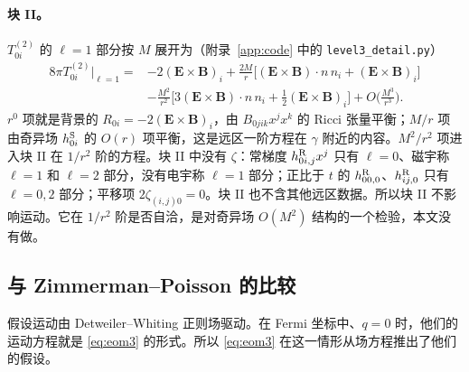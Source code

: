 \documentclass[11pt,a4paper]{ctexart}
\numberwithin{equation}{section}
\begin{document}
\paragraph{块 II。}$T^{(2)}_{0i}$ 的 $\ell=1$ 部分按 $M$ 展开为（附录~\ref{app:code} 中的 \texttt{level3\_detail.py}）
\begin{equation}
\begin{split}
8\pi T^{(2)}_{0i}\Big|_{\ell=1}={}&-2(\boldsymbol E\times\boldsymbol B)_i
+\frac{2M}{r}\Big[(\boldsymbol E\times\boldsymbol B)\!\cdot\!n\,n_i+(\boldsymbol E\times\boldsymbol B)_i\Big]\\
&-\frac{M^2}{r^2}\Big[3(\boldsymbol E\times\boldsymbol B)\!\cdot\!n\,n_i+\tfrac12(\boldsymbol E\times\boldsymbol B)_i\Big]+O\Big(\frac{M^3}{r^3}\Big).
\end{split}
\label{eq:T2blockII}
\end{equation}
$r^0$ 项就是背景的 $R_{0i}=-2(\boldsymbol E\times\boldsymbol B)_i$，由 $B_{0jik}x^jx^k$ 的 Ricci 张量平衡；$M/r$ 项由奇异场 $h^{\rm S}_{0i}$ 的 $O(r)$ 项平衡，这是远区一阶方程在 $\gamma$ 附近的内容。$M^2/r^2$ 项进入块 II 在 $1/r^2$ 阶的方程。块 II 中没有 $\zeta$：常梯度 $h^{\rm R}_{0i,j}x^j$ 只有 $\ell=0$、磁宇称 $\ell=1$ 和 $\ell=2$ 部分，没有电宇称 $\ell=1$ 部分；正比于 $t$ 的 $h^{\rm R}_{00,0}$、$h^{\rm R}_{ij,0}$ 只有 $\ell=0,2$ 部分；平移项 $2\zeta_{(i,j)0}=0$。块 II 也不含其他远区数据。所以块 II 不影响运动。它在 $1/r^2$ 阶是否自洽，是对奇异场 $O(M^2)$ 结构的一个检验，本文没有做。

\subsection{与 Zimmerman--Poisson 的比较}
\label{sec:L3ZP}

\citet{ZimmermanPoisson2014} 假设运动由 Detweiler--Whiting 正则场驱动。在 Fermi 坐标中、$q=0$ 时，他们的运动方程就是 \eqref{eq:eom3} 的形式。所以 \eqref{eq:eom3} 在这一情形从场方程推出了他们的假设。
\end{document}

